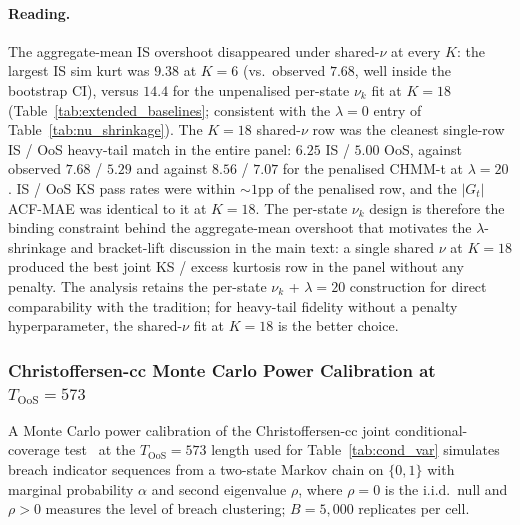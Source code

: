 \paragraph{Reading.}
The aggregate-mean IS overshoot disappeared under shared-$\nu$ at every $K$: the largest IS sim kurt was $9.38$ at $K = 6$ (vs.\ observed $7.68$, well inside the bootstrap CI), versus $14.4$ for the unpenalised per-state $\nu_k$ fit at $K = 18$ (Table~\ref{tab:extended_baselines}; consistent with the $\lambda = 0$ entry of Table~\ref{tab:nu_shrinkage}). The $K = 18$ shared-$\nu$ row was the cleanest single-row IS / OoS heavy-tail match in the entire panel: $6.25$ IS / $5.00$ OoS, against observed $7.68$ / $5.29$ and against $8.56$ / $7.07$ for the penalised CHMM-t at $\lambda = 20$. IS / OoS KS pass rates were within $\sim 1$pp of the penalised row, and the $|G_t|$ ACF-MAE was identical to it at $K = 18$. The per-state $\nu_k$ design is therefore the binding constraint behind the aggregate-mean overshoot that motivates the $\lambda$-shrinkage and bracket-lift discussion in the main text: a single shared $\nu$ at $K = 18$ produced the best joint KS / excess kurtosis row in the panel without any penalty. The analysis retains the per-state $\nu_k$ + $\lambda = 20$ construction for direct comparability with the \citet{peel2000robust, liu1995ml} tradition; for heavy-tail fidelity without a penalty hyperparameter, the shared-$\nu$ fit at $K = 18$ is the better choice.

\subsubsection{\texorpdfstring{Christoffersen-cc Monte Carlo Power Calibration at $T_{\text{OoS}} = 573$}{Christoffersen-cc Monte Carlo Power Calibration at T\_OoS = 573}}
\label{sec:christoffersen_power}

A Monte Carlo power calibration of the Christoffersen-cc joint conditional-coverage test~\citep{christoffersen1998evaluating} at the $T_{\text{OoS}} = 573$ length used for Table~\ref{tab:cond_var} simulates breach indicator sequences from a two-state Markov chain on $\{0, 1\}$ with marginal probability $\alpha$ and second eigenvalue $\rho$, where $\rho = 0$ is the i.i.d.\ null and $\rho > 0$ measures the level of breach clustering; $B = 5{,}000$ replicates per cell.

